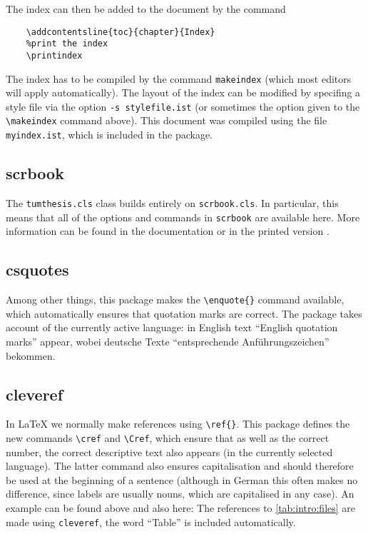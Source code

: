 The index can then be added to the document by the command

\begin{lstlisting}[language={[LaTex]TeX}]
	%Add the index to the table of contents
	\addcontentsline{toc}{chapter}{Index}
	%print the index
	\printindex
\end{lstlisting}
The index has to be compiled by the command \verb|makeindex| (which most editors will apply automatically). The layout of the index can be modified by specifing a style file via the option \verb|-s stylefile.ist| (or sometimes the option given to the \verb|\makeindex| command above). This document was compiled using the file \verb|myindex.ist|, which is included in the package.

\subsection{scrbook}
\label{sec:intro:scrbook}
The \texttt{tumthesis.cls} class builds entirely on \texttt{scrbook.cls}. In particular, this means that all of the options and commands in \texttt{scrbook} are available here. More information can be found in the documentation \cite{KohmMorawski2012} or in the printed version \textcite{KohmMorawski2012b}.


\subsection{csquotes}
\label{sec:intro:csquotes}
Among other things, this package makes the \verb|\enquote{}| command available, which automatically ensures that quotation marks are correct. The package takes account of the currently active language: in English text \enquote{English quotation marks} appear,  wobei deutsche Texte \enquote{entsprechende Anführungszeichen} bekommen. 


\subsection{cleveref}
\label{sec:intro:cleveref}
In \LaTeX{} we normally make references using \verb|\ref{}|. This package defines the new commands \verb|\cref| and \verb|\Cref|, which ensure that as well as the correct number, the correct descriptive text also appears (in the currently selected language). The latter command also ensures capitalisation and should therefore be used at the beginning of a sentence (although in German this often makes no difference, since labels are usually nouns, which are capitalised in any case). An example can be found above and also here: The references to \cref{tab:intro:files} are made using \texttt{cleveref}, the word \enquote{Table} is included automatically.


